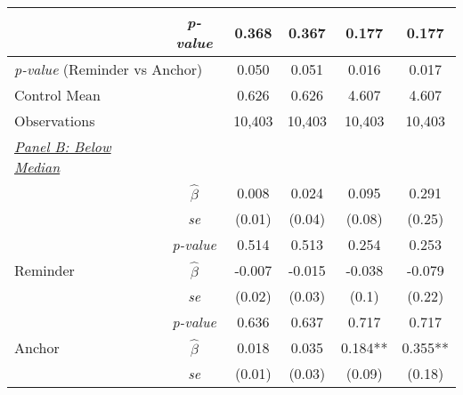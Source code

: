 \begin{tabular}{cccccc}
\multicolumn{1}{l}{} & \multicolumn{1}{c}{\scriptsize{\textit{p-value}}} & \multicolumn{1}{c}{0.368} & \multicolumn{1}{c}{0.367} & \multicolumn{1}{c}{0.177} & \multicolumn{1}{c}{0.177} \\
\midrule
\multicolumn{2}{l}{\textit{p-value} (Reminder vs Anchor)}& \multicolumn{1}{c}{0.050}& \multicolumn{1}{c}{0.051}& \multicolumn{1}{c}{0.016}& \multicolumn{1}{c}{0.017}\\
\multicolumn{2}{l}{Control Mean} &0.626&0.626&4.607&4.607\\
\multicolumn{2}{l}{Observations} &10,403&10,403&10,403&10,403\\
\midrule
\multicolumn{1}{l}{\underline{\textit{Panel B: Below Median}}} &  &  &  & &\\ 
 \addlinespace
\multicolumn{1}{l}{Any Treatment} & \multicolumn{1}{c}{\scriptsize $\hat{\beta}$} & \multicolumn{1}{c}{0.008} & \multicolumn{1}{c}{0.024} & \multicolumn{1}{c}{0.095} & \multicolumn{1}{c}{0.291} \\
\multicolumn{1}{l}{} & \multicolumn{1}{c}{\scriptsize{\textit{se}}} & \multicolumn{1}{c}{(0.01)} & \multicolumn{1}{c}{(0.04)} & \multicolumn{1}{c}{(0.08)} & \multicolumn{1}{c}{(0.25)} \\
\multicolumn{1}{l}{} & \multicolumn{1}{c}{\scriptsize{\textit{p-value}}} & \multicolumn{1}{c}{0.514} & \multicolumn{1}{c}{0.513} & \multicolumn{1}{c}{0.254} & \multicolumn{1}{c}{0.253} \\
\multicolumn{1}{l}{Reminder} & \multicolumn{1}{c}{\scriptsize $\hat{\beta}$} & \multicolumn{1}{c}{-0.007} & \multicolumn{1}{c}{-0.015} & \multicolumn{1}{c}{-0.038} & \multicolumn{1}{c}{-0.079} \\
\multicolumn{1}{l}{} & \multicolumn{1}{c}{\scriptsize{\textit{se}}} & \multicolumn{1}{c}{(0.02)} & \multicolumn{1}{c}{(0.03)} & \multicolumn{1}{c}{(0.1)} & \multicolumn{1}{c}{(0.22)} \\
\multicolumn{1}{l}{} & \multicolumn{1}{c}{\scriptsize{\textit{p-value}}} & \multicolumn{1}{c}{0.636} & \multicolumn{1}{c}{0.637} & \multicolumn{1}{c}{0.717} & \multicolumn{1}{c}{0.717} \\
\multicolumn{1}{l}{Anchor} & \multicolumn{1}{c}{\scriptsize $\hat{\beta}$} & \multicolumn{1}{c}{0.018} & \multicolumn{1}{c}{0.035} & \multicolumn{1}{c}{0.184**} & \multicolumn{1}{c}{0.355**} \\
\multicolumn{1}{l}{} & \multicolumn{1}{c}{\scriptsize{\textit{se}}} & \multicolumn{1}{c}{(0.01)} & \multicolumn{1}{c}{(0.03)} & \multicolumn{1}{c}{(0.09)} & \multicolumn{1}{c}{(0.18)} \\

\end{tabular}
